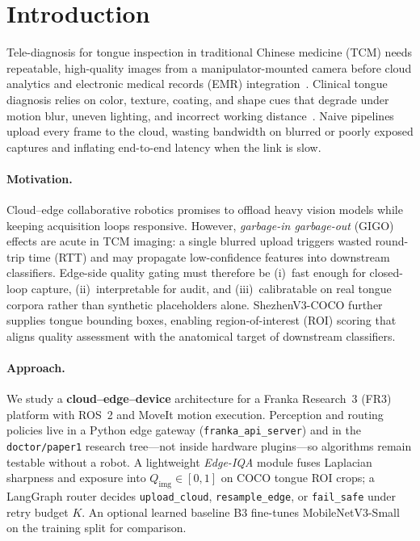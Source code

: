 \section{Introduction}
\label{sec:intro}

Tele-diagnosis for tongue inspection in traditional Chinese medicine (TCM) needs repeatable, high-quality images from a manipulator-mounted camera before cloud analytics and electronic medical records (EMR) integration~\cite{zhang2020tongue,qi2016tongue}.
Clinical tongue diagnosis relies on color, texture, coating, and shape cues that degrade under motion blur, uneven lighting, and incorrect working distance~\cite{zhang2020tongue}.
Naive pipelines upload every frame to the cloud, wasting bandwidth on blurred or poorly exposed captures and inflating end-to-end latency when the link is slow.

\paragraph{Motivation.}
Cloud--edge collaborative robotics promises to offload heavy vision models while keeping acquisition loops responsive.
However, \emph{garbage-in garbage-out} (GIGO) effects are acute in TCM imaging: a single blurred upload triggers wasted round-trip time (RTT) and may propagate low-confidence features into downstream classifiers.
Edge-side quality gating must therefore be (i)~fast enough for closed-loop capture, (ii)~interpretable for audit, and (iii)~calibratable on real tongue corpora rather than synthetic placeholders alone.
ShezhenV3-COCO further supplies tongue bounding boxes, enabling region-of-interest (ROI) scoring that aligns quality assessment with the anatomical target of downstream classifiers.

\paragraph{Approach.}
We study a \textbf{cloud--edge--device} architecture for a Franka Research~3 (FR3) platform with ROS~2 and MoveIt motion execution.
Perception and routing policies live in a Python edge gateway (\texttt{franka\_api\_server}) and in the \texttt{doctor/paper1} research tree---not inside hardware plugins---so algorithms remain testable without a robot.
A lightweight \emph{Edge-IQA} module fuses Laplacian sharpness and exposure into $Q_{\mathrm{img}}\in[0,1]$ on COCO tongue ROI crops; a LangGraph router decides \texttt{upload\_cloud}, \texttt{resample\_edge}, or \texttt{fail\_safe} under retry budget $K$.
An optional learned baseline B3 fine-tunes MobileNetV3-Small on the training split for comparison.

